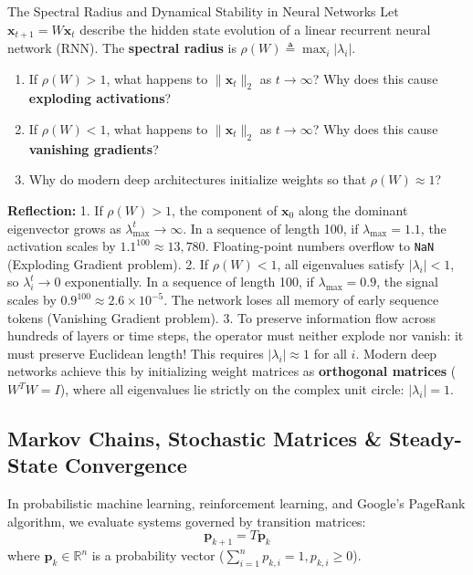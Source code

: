 \begin{ponderbox}{The Spectral Radius and Dynamical Stability in Neural Networks}
Let $\mathbf{x}_{t+1} = W \mathbf{x}_t$ describe the hidden state evolution of a linear recurrent neural network (RNN). The \textbf{spectral radius} is $\rho(W) \triangleq \max_i |\lambda_i|$.
\begin{enumerate}
    \item If $\rho(W) > 1$, what happens to $\|\mathbf{x}_t\|_2$ as $t \to \infty$? Why does this cause \textbf{exploding activations}?
    \item If $\rho(W) < 1$, what happens to $\|\mathbf{x}_t\|_2$ as $t \to \infty$? Why does this cause \textbf{vanishing gradients}?
    \item Why do modern deep architectures initialize weights so that $\rho(W) \approx 1$?
\end{enumerate}
\tcblower
\textbf{Reflection:}
1. If $\rho(W) > 1$, the component of $\mathbf{x}_0$ along the dominant eigenvector grows as $\lambda_{\max}^t \to \infty$. In a sequence of length 100, if $\lambda_{\max} = 1.1$, the activation scales by $1.1^{100} \approx 13{,}780$. Floating-point numbers overflow to \texttt{NaN} (Exploding Gradient problem).
2. If $\rho(W) < 1$, all eigenvalues satisfy $|\lambda_i| < 1$, so $\lambda_i^t \to 0$ exponentially. In a sequence of length 100, if $\lambda_{\max} = 0.9$, the signal scales by $0.9^{100} \approx 2.6 \times 10^{-5}$. The network loses all memory of early sequence tokens (Vanishing Gradient problem).
3. To preserve information flow across hundreds of layers or time steps, the operator must neither explode nor vanish: it must preserve Euclidean length! This requires $|\lambda_i| \approx 1$ for all $i$. Modern deep networks achieve this by initializing weight matrices as \textbf{orthogonal matrices} ($W^T W = I$), where all eigenvalues lie strictly on the complex unit circle: $|\lambda_i| = 1$.
\end{ponderbox}

\subsection{Markov Chains, Stochastic Matrices \& Steady-State Convergence}
In probabilistic machine learning, reinforcement learning, and Google's PageRank algorithm, we evaluate systems governed by transition matrices:
\begin{equation}
\mathbf{p}_{k+1} = T \mathbf{p}_k
\end{equation}
where $\mathbf{p}_k \in \mathbb{R}^n$ is a probability vector ($\sum_{i=1}^n p_{k,i} = 1, p_{k,i} \ge 0$).

